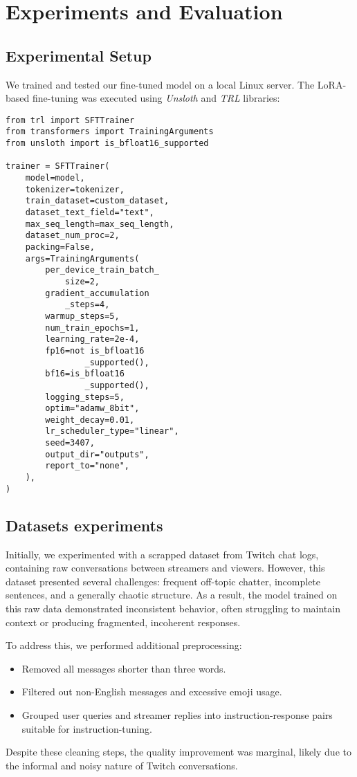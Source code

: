 \documentclass[conference]{IEEEtran}
\begin{document}
\section{Experiments and Evaluation}
\subsection{Experimental Setup}
We trained and tested our fine-tuned model on a local Linux server. The LoRA-based fine-tuning was executed using \textit{Unsloth} and \textit{TRL} libraries:
\begin{verbatim}
from trl import SFTTrainer
from transformers import TrainingArguments
from unsloth import is_bfloat16_supported

trainer = SFTTrainer(
	model=model,
	tokenizer=tokenizer,
	train_dataset=custom_dataset,
	dataset_text_field="text",
	max_seq_length=max_seq_length,
	dataset_num_proc=2,
	packing=False,
	args=TrainingArguments(
		per_device_train_batch_
            size=2,
		gradient_accumulation
            _steps=4,
		warmup_steps=5,
		num_train_epochs=1,
		learning_rate=2e-4,
		fp16=not is_bfloat16
                _supported(),
		bf16=is_bfloat16
                _supported(),
		logging_steps=5,
		optim="adamw_8bit",
		weight_decay=0.01,
		lr_scheduler_type="linear",
		seed=3407,
		output_dir="outputs",
		report_to="none",
	),
)
\end{verbatim}

\subsection{Datasets experiments}
        Initially, we experimented with a scrapped dataset from Twitch chat logs, containing raw conversations between streamers and viewers. However, this dataset presented several challenges: frequent off-topic chatter, incomplete sentences, and a generally chaotic structure. As a result, the model trained on this raw data demonstrated inconsistent behavior, often struggling to maintain context or producing fragmented, incoherent responses.

        To address this, we performed additional preprocessing:
        \begin{itemize}
            \item Removed all messages shorter than three words.
            \item Filtered out non-English messages and excessive emoji usage.
            \item Grouped user queries and streamer replies into instruction-response pairs suitable for instruction-tuning.
        \end{itemize}
        Despite these cleaning steps, the quality improvement was marginal, likely due to the informal and noisy nature of Twitch conversations.
        
\end{document}

